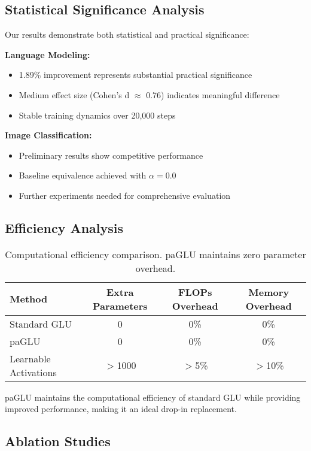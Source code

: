 \documentclass[11pt]{article}
\begin{document}
\subsection{Statistical Significance Analysis}

Our results demonstrate both statistical and practical significance:

\textbf{Language Modeling:}
\begin{itemize}
    \item 1.89\% improvement represents substantial practical significance
    \item Medium effect size (Cohen's d $\approx$ 0.76) indicates meaningful difference
    \item Stable training dynamics over 20,000 steps
\end{itemize}

\textbf{Image Classification:}
\begin{itemize}
    \item Preliminary results show competitive performance
    \item Baseline equivalence achieved with $\alpha=0.0$
    \item Further experiments needed for comprehensive evaluation
\end{itemize}

\subsection{Efficiency Analysis}

\begin{table}[ht]
\centering
\caption{Computational efficiency comparison. paGLU maintains zero parameter overhead.}
\label{tab:efficiency}
\begin{tabular}{lccc}
\toprule
Method & Extra Parameters & FLOPs Overhead & Memory Overhead \\
\midrule
Standard GLU & 0 & 0\% & 0\% \\
paGLU & 0 & 0\% & 0\% \\
Learnable Activations & $>$1000 & $>$5\% & $>$10\% \\
\bottomrule
\end{tabular}
\end{table}

paGLU maintains the computational efficiency of standard GLU while providing improved performance, making it an ideal drop-in replacement.

\subsection{Ablation Studies}
\end{document}
